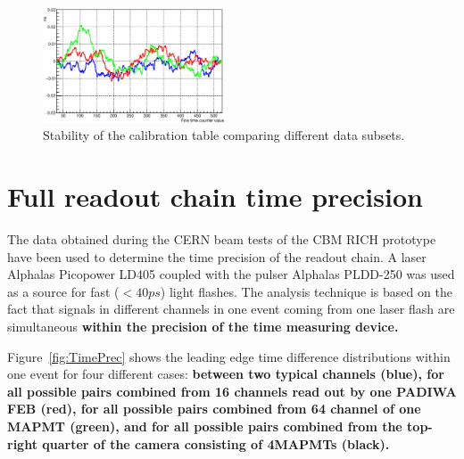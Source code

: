 \documentclass[final,5p,times,twocolumn]{elsarticle}
\begin{document}
\begin{figure}[h]
	\centering
	\includegraphics[width=0.48\textwidth]{figures/Stability_01_diff.eps}
	\caption{Stability of the calibration table comparing different data subsets.}
	\label{fig:CalibStability}
\end{figure}


\section{Full readout chain time precision}

The data obtained during the CERN beam tests of the CBM RICH prototype have been used to determine the time precision of the readout chain. A laser Alphalas Picopower LD405 coupled with the pulser Alphalas PLDD-250 \cite{LASER} was used as a source for fast ($<40ps$) light flashes. The analysis technique is based on the fact that signals in different channels in one event coming from one laser flash are simultaneous \textbf{within the precision of the time measuring device.}


Figure~\ref{fig:TimePrec} shows the leading edge time difference distributions within one event for four different cases:
\textbf{between two typical channels (blue), for all possible pairs combined from 16 channels read out by one PADIWA FEB (red), for all possible pairs combined from 64 channel of one MAPMT (green), and  for all possible pairs combined from the top-right quarter of the camera consisting of 4MAPMTs (black).}
\end{document}
